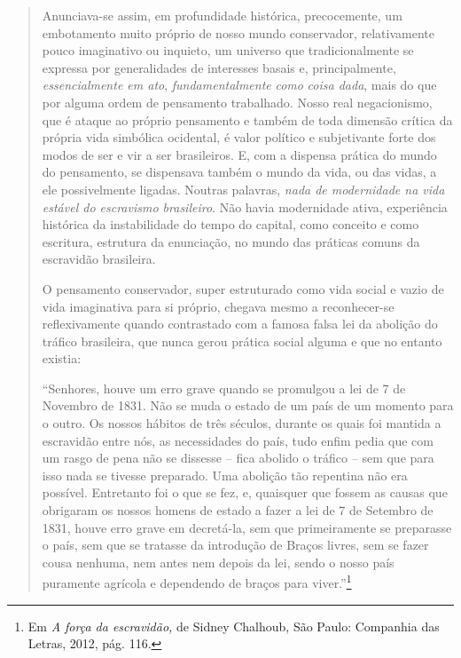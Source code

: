\begin{quote}
Anunciava-se assim, em profundidade histórica, precocemente, um
embotamento muito próprio de nosso mundo conservador, relativamente
pouco imaginativo ou inquieto, um universo que tradicionalmente se
expressa por generalidades de interesses basais e, principalmente,
\emph{essencialmente em ato}, \emph{fundamentalmente} \emph{como}
\emph{coisa dada}, mais do que por alguma ordem de pensamento
trabalhado. Nosso real negacionismo, que é ataque ao próprio pensamento
e também de toda dimensão crítica da própria vida simbólica ocidental, é
valor político e subjetivante forte dos modos de ser e vir a ser
brasileiros. E, com a dispensa prática do mundo do pensamento, se
dispensava também o mundo da vida, ou das vidas, a ele possivelmente
ligadas. Noutras palavras, \emph{nada de modernidade na vida estável do
escravismo brasileiro}. Não havia modernidade ativa, experiência
histórica da instabilidade do tempo do capital, como conceito e como
escritura, estrutura da enunciação, no mundo das práticas comuns da
escravidão brasileira.

O pensamento conservador, super estruturado como vida social e vazio de
vida imaginativa para si próprio, chegava mesmo a reconhecer-se
reflexivamente quando contrastado com a famosa falsa lei da abolição do
tráfico brasileira, que nunca gerou prática social alguma e que no
entanto existia:

``Senhores, houve um erro grave quando se promulgou a lei de 7 de
Novembro de 1831. Não se muda o estado de um país de um momento para o
outro. Os nossos hábitos de três séculos, durante os quais foi mantida a
escravidão entre nós, as necessidades do país, tudo enfim pedia que com
um rasgo de pena não se dissesse -- fica abolido o tráfico -- sem que
para isso nada se tivesse preparado. Uma abolição tão repentina não era
possível. Entretanto foi o que se fez, e, quaisquer que fossem as causas
que obrigaram os nossos homens de estado a fazer a lei de 7 de Setembro
de 1831, houve erro grave em decretá-la, sem que primeiramente se
preparasse o país, sem que se tratasse da introdução de Braços livres,
sem se fazer cousa nenhuma, nem antes nem depois da lei, sendo o nosso
país puramente agrícola e dependendo de braços para viver.''\footnote{Em
  \emph{A força da escravidão,} de Sidney Chalhoub, São Paulo: Companhia
  das Letras, 2012, pág. 116.}


\end{quote}
